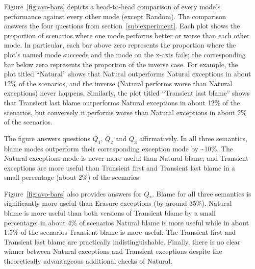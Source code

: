 Figure~\ref{fig:avo-bars} depicts a head-to-head comparison of every
mode's performance against every other mode (except Random). The
comparison  answers the four questions from section~\ref{sub:experiment}. 
Each plot shows the proportion of scenarios where one mode performs
better or worse than each other mode.  In particular, each bar above zero
represents the proportion where the plot's named mode succeeds and the
mode on the x-axis fails; the corresponding bar below zero represents the
proportion of the inverse case.  For example, the plot titled ``Natural''
shows that Natural outperforms Natural exceptions in about 12\% of the
scenarios, and the inverse (Natural performs worse than Natural
exceptions) never happens.  Similarly, the plot titled ``Transient last
blame'' shows that Transient last blame outperforms Natural exceptions
 in about 12\% of the scenarios, but conversely it performs worse
than Natural exceptions in about 2\% of the scenarios.

The figure answers questions $Q_1$, $Q_2$ and $Q_3$ affirmatively.  
In all three semantics, blame modes outperform their
corresponding exception mode by \textasciitilde10\%.  The
Natural exceptions mode is never more useful than Natural blame, and
Transient exceptions are more useful than Transient first and Transient
last blame in a small percentage (about 2\%) of the scenarios. 

Figure~\ref{fig:avo-bars} also provides answers for $Q_*$.
Blame for all three semantics is significantly
more useful than Erasure exceptions (by around 35\%). Natural blame is
more useful than both versions of Transient blame by a small percentage;
in about 4\% of scenarios Natural blame is more useful while in about 1.5\% of the
scenarios Transient blame is more useful. The Transient first and
Transient last blame are practically indistinguishable. Finally, there is
no clear winner between Natural exceptions and Transient exceptions
despite the theoretically advantageous additional checks of Natural.

